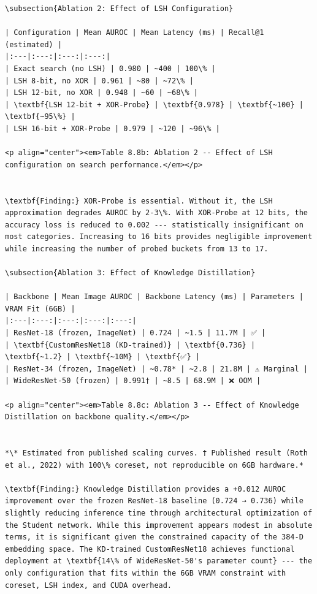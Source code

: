 \documentclass[12pt,a4paper,oneside]{report}
\begin{document}
\begin{verbatim}
\subsection{Ablation 2: Effect of LSH Configuration}

| Configuration | Mean AUROC | Mean Latency (ms) | Recall@1 (estimated) |
|:---|:---:|:---:|:---:|
| Exact search (no LSH) | 0.980 | ~400 | 100\% |
| LSH 8-bit, no XOR | 0.961 | ~80 | ~72\% |
| LSH 12-bit, no XOR | 0.948 | ~60 | ~68\% |
| \textbf{LSH 12-bit + XOR-Probe} | \textbf{0.978} | \textbf{~100} | \textbf{~95\%} |
| LSH 16-bit + XOR-Probe | 0.979 | ~120 | ~96\% |

<p align="center"><em>Table 8.8b: Ablation 2 -- Effect of LSH configuration on search performance.</em></p>


\textbf{Finding:} XOR-Probe is essential. Without it, the LSH approximation degrades AUROC by 2-3\%. With XOR-Probe at 12 bits, the accuracy loss is reduced to 0.002 --- statistically insignificant on most categories. Increasing to 16 bits provides negligible improvement while increasing the number of probed buckets from 13 to 17.

\subsection{Ablation 3: Effect of Knowledge Distillation}

| Backbone | Mean Image AUROC | Backbone Latency (ms) | Parameters | VRAM Fit (6GB) |
|:---|:---:|:---:|:---:|:---:|
| ResNet-18 (frozen, ImageNet) | 0.724 | ~1.5 | 11.7M | ✅ |
| \textbf{CustomResNet18 (KD-trained)} | \textbf{0.736} | \textbf{~1.2} | \textbf{~10M} | \textbf{✅} |
| ResNet-34 (frozen, ImageNet) | ~0.78* | ~2.8 | 21.8M | ⚠️ Marginal |
| WideResNet-50 (frozen) | 0.991† | ~8.5 | 68.9M | ❌ OOM |

<p align="center"><em>Table 8.8c: Ablation 3 -- Effect of Knowledge Distillation on backbone quality.</em></p>


*\* Estimated from published scaling curves. † Published result (Roth et al., 2022) with 100\% coreset, not reproducible on 6GB hardware.*

\textbf{Finding:} Knowledge Distillation provides a +0.012 AUROC improvement over the frozen ResNet-18 baseline (0.724 → 0.736) while slightly reducing inference time through architectural optimization of the Student network. While this improvement appears modest in absolute terms, it is significant given the constrained capacity of the 384-D embedding space. The KD-trained CustomResNet18 achieves functional deployment at \textbf{14\% of WideResNet-50's parameter count} --- the only configuration that fits within the 6GB VRAM constraint with coreset, LSH index, and CUDA overhead.


\end{verbatim}
\end{document}

